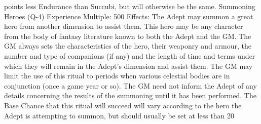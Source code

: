 \documentclass[a4paper]{article}
\begin{document}
\begin{multicols}{3}
points less Endurance than Succubi, but will otherwise be the same.
Summoning Heroes (Q-4)
Experience Multiple: 500
Effects: The Adept may summon a great hero from
another dimension to assist them. This hero may be
any character from the body of fantasy literature
known to both the Adept and the GM. The GM
always sets the characteristics of the hero, their
weaponry and armour, the number and type of
companions (if any) and the length of time and
terms under which they will remain in the Adept’s
dimension and assist them. The GM may limit the
use of this ritual to periods when various celestial
bodies are in conjunction (once a game year or so).
The GM need not inform the Adept of any details
concerning the results of the summoning until it
has been performed.
The Base Chance that this ritual will succeed will
vary according to the hero the Adept is attempting
to summon, but should usually be set at less than
20%


\end{multicols}
\end{document}
